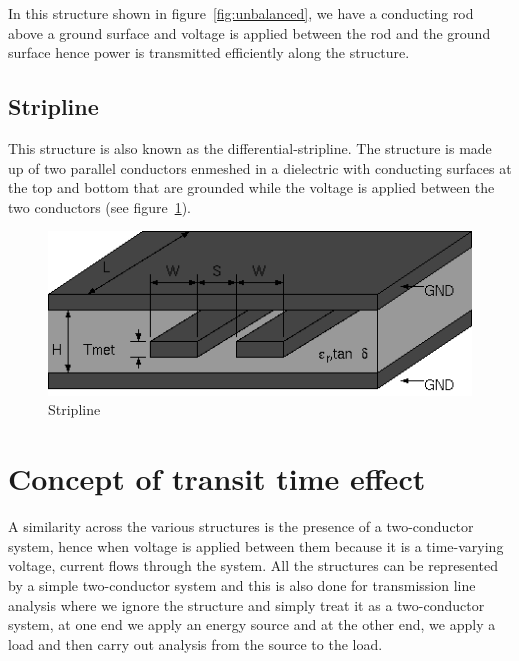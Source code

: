 In this structure shown in figure~\ref{fig:unbalanced}, we have a conducting rod above a ground surface and voltage is applied between the rod and the ground surface hence power is transmitted efficiently along the structure.

\subsection{Stripline} 
This structure is also known as the differential-stripline. The structure is made up of two parallel conductors enmeshed in a dielectric with conducting surfaces at the top and bottom that are grounded while the voltage is applied between the two conductors (see figure~\ref{fig:stripline}).
\begin{figure}[h]
\centering
\includegraphics[width=1\linewidth]{./graphics/stripline}
\caption{ Stripline}
\label{fig:stripline}
\end{figure}

\section{Concept of transit time effect }
A similarity across the various structures is the presence of a two-conductor system, hence when voltage is applied between them because it is a time-varying voltage, current flows through the system. All the structures can be represented by a simple two-conductor system and this is also done for transmission line analysis where we ignore the structure and simply treat it as a two-conductor system, at one end we apply an energy source and at the other end, we apply a load and then carry out analysis from the source to the load.


